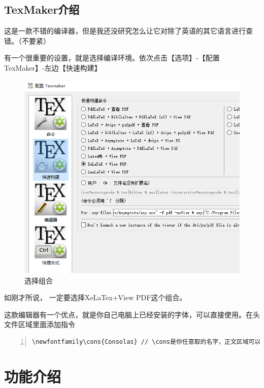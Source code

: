 \documentclass[12pt,a4paper,oneside]{book}
\begin{document}
\section{TexMaker介绍}
这是一款不错的编译器，但是我还没研究怎么让它对除了英语的其它语言进行查错。（不要紧）
\par
有一个很重要的设置，就是选择编译环境。依次点击【选项】-【配置TexMaker】-左边【快速构建】
\par
\begin{figure}[htp] 
\centering 
\includegraphics[scale=0.45]{tm.png}
\caption{选择组合}%
\label{pic:tm}
\end{figure}

\par
如刚才所说，{\color{cyan} 一定要选择}XeLaTex+View PDF这个组合。
\par
这款编辑器有一个优点，就是你自己电脑上已经安装的字体，可以直接使用。在头文件区域里面添加指令
\par
\begin{lstlisting}[language={[ANSI]C}, numbers=left, numberstyle=\tiny, keywordstyle=\color{blue!70},  frame=shadowbox, rulesepcolor=\color{red!20!green!20!blue!20}]
\newfontfamily\cons{Consolas} // \cons是你任意取的名字，正文区域可以当作指令使用
\end{lstlisting}
\par

\chapter{功能介绍}
\end{document}

